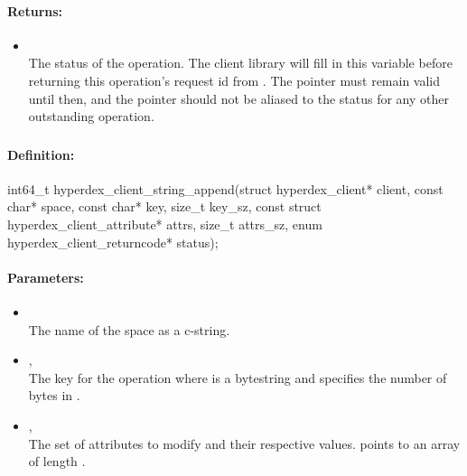 \paragraph{Returns:}
\begin{itemize}[noitemsep]
\item {}\\
The status of the operation.  The client library will fill in this variable before returning this operation's request id from .  The pointer must remain valid until then, and the pointer should not be aliased to the status for any other outstanding operation.
\end{itemize}

\pagebreak
\subsubsection{}
\label{api:c:string_append}


\paragraph{Definition:}
\begin{ccode}
int64_t hyperdex_client_string_append(struct hyperdex_client* client,
        const char* space,
        const char* key, size_t key_sz,
        const struct hyperdex_client_attribute* attrs, size_t attrs_sz,
        enum hyperdex_client_returncode* status);
\end{ccode}

\paragraph{Parameters:}
\begin{itemize}[noitemsep]
\item {}\\
The name of the space as a c-string.
\item {}, \\
The key for the operation where  is a bytestring and  specifies the number of bytes in .
\item {}, \\
The set of attributes to modify and their respective values.   points to an array of length .
\end{itemize}

